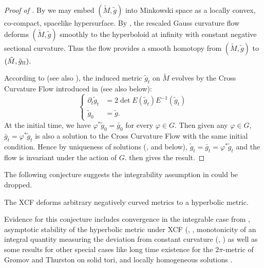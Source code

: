 \documentclass[a4paper,12pt]{amsart}
\begin{document}
\begin{proof}
[Proof of ]

By  we may embed \((\tilde{M}, \tilde{g})\) into Minkowski space as a locally convex, co-compact, spacelike hypersurface. By \cite[Theorem 1.1]{MR3344442}, the rescaled Gauss curvature flow deforms \((\tilde{M}, \tilde{g})\) smoothly to the hyperboloid at infinity with constant negative sectional curvature. Thus the flow provides a smooth homotopy from \((\tilde{M}, \tilde{g})\) to \((\tilde{M}, \tilde{g}_{\mathbb{H}})\).

According to \cite[Section 12]{MR3344442} (see also ), the induced metric \(\tilde{g}_t\) on \(\tilde{M}\) evolves by the Cross Curvature Flow introduced in \cite{MR2055396} (see also  below):
\[
\begin{cases}
\partial_t \tilde{g}_t &= 2\det E(\tilde{g}_{t}) E^{-1}(\tilde{g}_{t}) \\
\tilde{g}_0 &= \tilde{g}.
\end{cases}
\]
At the initial time, we have \(\varphi^{\ast} \tilde{g}_0 = \tilde{g_0}\) for every \(\varphi \in G\). Then given any \(\varphi \in G\), \(\bar{g}_t = \varphi^{\ast} \tilde{g}_t\) is also a solution to the Cross Curvature Flow with the same initial condition. Hence by uniqueness of solutions (\cite{MR2055396,MR2207496},  and  below), \(\tilde{g}_t = \bar{g}_t = \varphi^{\ast} \tilde{g}_t\) and the flow is invariant under the action of \(G\).  then gives the result.
\end{proof}

The following conjecture suggests the integrability assumption in  could be dropped.

\begin{conj}[\cite{MR2055396}]
\label{conj:chow_hamilton}

The XCF deforms arbitrary negatively curved metrics to a hyperbolic metric.
\end{conj}

Evidence for this conjecture includes convergence in the integrable case from , asymptotic stability of the hyperbolic metric under XCF (\cite{MR2448593}, , monotonicity of an integral quantity measuring the deviation from constant curvature (\cite{MR2055396}, ) as well as some results for other special cases like long time existence for the \(2\pi\)-metric of Gromov and Thurston on solid tori, and locally homogeneous solutions \cite{}.
\end{document}

